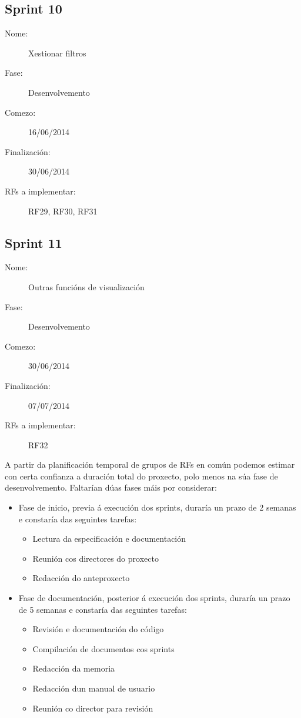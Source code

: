 \subsection*{Sprint 10}
\begin{description}
\item[Nome:] Xestionar filtros
\item[Fase:] Desenvolvemento
\item[Comezo:] 16/06/2014
\item[Finalización:] 30/06/2014
\item[RFs a implementar:] RF29, RF30, RF31
\end{description}

\subsection*{Sprint 11}
\begin{description}
\item[Nome:] Outras funcións de visualización
\item[Fase:] Desenvolvemento
\item[Comezo:] 30/06/2014
\item[Finalización:] 07/07/2014
\item[RFs a implementar:] RF32
\end{description}

A partir da planificación temporal de grupos de RFs en común podemos estimar con certa confianza a duración total do proxecto, polo menos na súa fase de desenvolvemento. Faltarían dúas fases máis por considerar:

\begin{itemize}
\item Fase de inicio, previa á execución dos sprints, duraría un prazo de 2 semanas e constaría das seguintes tarefas:
\begin{itemize}
\item Lectura da especificación e documentación
\item Reunión cos directores do proxecto
\item Redacción do anteproxecto
\end{itemize} 
\item Fase de documentación, posterior á execución dos sprints, duraría un prazo de 5 semanas e constaría das seguintes tarefas:
\begin{itemize}
\item Revisión e documentación do código
\item Compilación de documentos cos sprints
\item Redacción da memoria
\item Redacción dun manual de usuario
\item Reunión co director para revisión
\end{itemize}
\end{itemize} 

